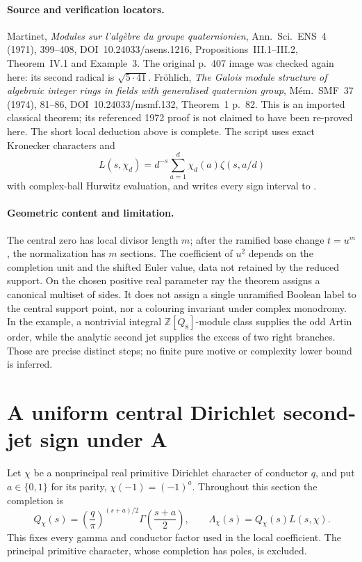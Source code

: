 \paragraph{Source and verification locators.}
Martinet, \emph{Modules sur l'alg\`ebre du groupe quaternionien},
Ann. Sci. ENS~4 (1971), 399--408,
DOI~10.24033/asens.1216, Propositions~III.1--III.2,
Theorem~IV.1 and Example~3. The original p.~407 image was checked
again here: its second radical is $\sqrt{5\cdot41}$.
Fr\"ohlich, \emph{The Galois module structure of algebraic integer
rings in fields with generalised quaternion group},
M\'em. SMF~37 (1974), 81--86, DOI~10.24033/msmf.132,
Theorem~1 p.~82. This is an imported classical theorem; its
referenced 1972 proof is not claimed to have been re-proved here.
The short local deduction above is complete.
The script  uses exact Kronecker
characters and
\[
 L(s,\chi_d)=d^{-s}\sum_{a=1}^d\chi_d(a)\zeta(s,a/d)
\]
with complex-ball Hurwitz evaluation, and writes every sign interval
to .

\paragraph{Geometric content and limitation.}
The central zero has local divisor length $m$; after the ramified
base change $t=u^m$, the normalization has $m$ sections. The
coefficient of $u^2$ depends on the completion unit and the shifted
Euler value, data not retained by the reduced support. On the chosen
positive real parameter ray the theorem assigns a canonical
multiset of sides. It does not assign a single unramified Boolean
label to the central support point, nor a colouring invariant under
complex monodromy. In the example, a nontrivial integral
$\mathbb Z[Q_8]$-module class supplies the odd Artin order, while
the analytic second jet supplies the excess of two right branches.
Those are precise distinct steps; no finite pure motive or
complexity lower bound is inferred.


\section{A uniform central Dirichlet second-jet sign under A}
\label{sec:analytic-central-dirichlet-sign}

Let $\chi$ be a nonprincipal real primitive Dirichlet character of
conductor $q$, and put $a\in\{0,1\}$ for its parity,
$\chi(-1)=(-1)^a$. Throughout this section the completion is
\begin{equation}\label{eq:analytic-dirichlet-completion}
 Q_\chi(s)=\left(\frac q\pi\right)^{(s+a)/2}
                \Gamma\left(\frac{s+a}{2}\right),\qquad
 \Lambda_\chi(s)=Q_\chi(s)L(s,\chi).
\end{equation}
This fixes every gamma and conductor factor used in the local
coefficient. The principal primitive character, whose completion
has poles, is excluded.

